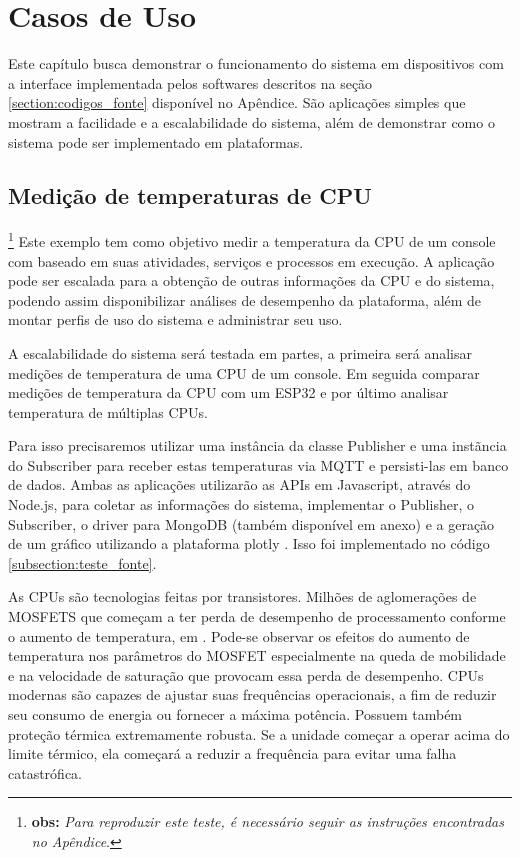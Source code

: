 \chapter{Casos de Uso}
\label{chapter:casos_de_uso}

Este capítulo busca demonstrar o funcionamento do sistema em dispositivos com a interface implementada pelos softwares descritos na seção \ref{section:codigos_fonte} disponível no Apêndice. São aplicações simples que mostram a facilidade e a escalabilidade do sistema, além de demonstrar como o sistema pode ser implementado em plataformas.

\section{Medição de temperaturas de CPU}
\label{section:temp_cpu}

\footnote{\textbf{obs:} \textit{Para reproduzir este teste, é necessário seguir as instruções encontradas no Apêndice}.} Este exemplo tem como objetivo medir a temperatura da CPU de um console com baseado em suas atividades, serviços e processos em execução. A aplicação pode ser escalada para a obtenção de outras informações da CPU e do sistema, podendo assim disponibilizar análises de desempenho da plataforma, além de montar perfis de uso do sistema e administrar seu uso.

A escalabilidade do sistema será testada em partes, a primeira será analisar medições de temperatura de uma CPU de um console. Em seguida comparar medições de temperatura da CPU com um ESP32 e por último analisar temperatura de múltiplas CPUs.

Para isso precisaremos utilizar uma instância da classe Publisher e uma instãncia do Subscriber para receber estas temperaturas via MQTT e persisti-las em banco de dados. Ambas as aplicações utilizarão as APIs em Javascript, através do Node.js, para coletar as informações do sistema, implementar o Publisher, o Subscriber, o driver para MongoDB (também disponível em anexo) e a geração de um gráfico utilizando a plataforma plotly \cite{plotly}. Isso foi implementado no código \ref{subsection:teste_fonte}.

As CPUs são tecnologias feitas por transistores. Milhões de aglomerações de MOSFETS que começam a  ter perda de desempenho de processamento conforme o aumento de temperatura, em \cite{jose}. Pode-se observar os efeitos do aumento de  temperatura nos parâmetros do MOSFET especialmente na queda de mobilidade e na velocidade de saturação que provocam essa perda de desempenho. CPUs modernas são capazes de ajustar suas frequências operacionais, a fim de reduzir seu consumo de energia ou fornecer a máxima potência. Possuem também proteção térmica extremamente robusta. Se a unidade começar a operar acima do limite térmico, ela começará a reduzir a frequência para evitar uma falha catastrófica.

